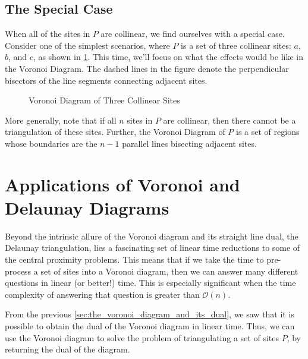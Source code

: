 \documentclass[12pt,twoside]{reedthesis}
\begin{document}
    \subsection{The Special Case} %
    \label{sub:special_case}

      When all of the sites in $P$ are collinear, we find ourselves with a special case. Consider one of the simplest scenarios, where $P$ is a set of three collinear sites: $a$, $b$, and $c$, as shown in \cref{fig:collinear}. This time, we'll focus on what the effects would be like in the Voronoi Diagram. The dashed lines in the figure denote the perpendicular bisectors of the line segments connecting adjacent sites. \par  

      \begin{figure}[!htb]
        \centering
        
        \caption{Voronoi Diagram of Three Collinear Sites}
        \label{fig:collinear}
      \end{figure}

      More generally, note that if all $n$ sites in $P$ are collinear, then there cannot be a triangulation of these sites. Further, the Voronoi Diagram of $P$ is a set of regions whose boundaries are the $n-1$ parallel lines bisecting adjacent sites. 


  \section{Applications of Voronoi and Delaunay Diagrams} %
  \label{sec:applications_of_voronoi_and_delaunay_diagrams}
    Beyond the intrinsic allure of the Voronoi diagram and its straight line dual, the Delaunay triangulation, lies a fascinating set of linear time reductions to some of the central proximity problems. This means that if we take the time to pre-process a set of sites into a Voronoi diagram, then we can answer many different questions in linear (or better!) time. This is especially significant when the time complexity of answering that question is greater than $\mathcal{O}(n)$.\par 

    From the previous \cref{sec:the_voronoi_diagram_and_its_dual}, we saw that it is possible to obtain the dual of the Voronoi diagram in linear time. Thus, we can use the Voronoi diagram to solve the problem of triangulating a set of sites $P$, by returning the dual of the diagram. 
\end{document}
